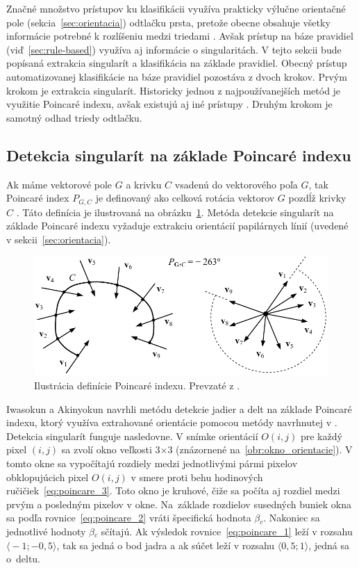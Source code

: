   Značné množstvo prístupov ku klasifikácii využíva prakticky výlučne orientačné pole (sekcia~{\ref{sec:orientacia}}) odtlačku prsta, pretože obecne obsahuje
  všetky informácie potrebné
  k rozlíšeniu medzi triedami \cite{Handbook}. Avšak prístup na báze pravidiel (viď~{\ref{sec:rule-based}}) využíva aj informácie o singularitách.
  V tejto sekcii bude popísaná extrakcia singularít a klasifikácia na základe pravidiel.
  Obecný prístup automatizovanej klasifikácie na báze pravidiel pozostáva z dvoch krokov. Prvým krokom je extrakcia singularít. Historicky jednou
  z najpoužívanejších metód je využitie Poincaré indexu, avšak existujú aj iné prístupy \cite{Handbook}. Druhým krokom je samotný odhad triedy odtlačku.

  \subsection{Detekcia singularít na základe Poincaré indexu} \label{sec:poincare}
  Ak máme vektorové pole $G$ a krivku $C$ vsadenú do vektorového poľa $G$, tak Poincaré index $P_{G,C}$ je definovaný ako celková rotácia vektorov $G$ pozdĺž
  krivky $C$ \cite{Handbook}. Táto definícia je ilustrovaná na obrázku~{\ref{obr:poincare_index}}. Metóda detekcie singularít na základe Poincaré indexu vyžaduje
  extrakciu orientácií papilárnych línií (uvedené v sekcii~{\ref{sec:orientacia}}).

  \begin{figure}[h]
    \centering
    \includegraphics[width=0.65\linewidth]{obrazky-figures/poincare_index.png}
    \caption{Ilustrácia definície Poincaré indexu. Prevzaté z \cite{Handbook}.}
    \label{obr:poincare_index}
  \end{figure}

  Iwasokun a Akinyokun \cite{iwasokun2014singularities} navrhli metódu detekcie jadier a delt na základe Poincaré indexu, ktorý využíva extrahované orientácie
  pomocou metódy navrhnutej v \cite{Hong}. Detekcia singularít funguje nasledovne. V snímke orientácií $O(i,j)$ pre každý pixel $(i,j)$ sa zvolí
  okno veľkosti $3$$\times{}$$3$ (znázornené na~{\ref{obr:okno_orientacie}}). V tomto okne sa vypočítajú rozdiely medzi jednotlivými pármi pixelov
  obklopujúcich pixel $O(i,j)$ v smere proti behu hodinových ručičiek~{\ref{eq:poincare_3}}. Toto okno je kruhové, čiže sa počíta aj rozdiel medzi prvým
  a posledným pixelov v okne. Na~základe rozdielov susedných buniek okna sa podľa rovnice~{\ref{eq:poincare_2}} vráti špecifická hodnota $\beta{}_c$.
  Nakoniec sa jednotlivé
  hodnoty $\beta{}_c$ sčítajú. Ak výsledok rovnice~{\ref{eq:poincare_1}} leží v rozsahu \mbox{$\langle{}-1;-0,5\rangle{}$}, tak sa jedná o bod jadra a ak súčet
  leží v rozsahu \mbox{$\langle{}0,5;1\rangle{}$}, jedná sa o~deltu.

